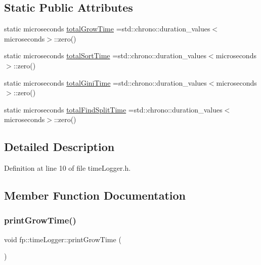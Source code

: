 \subsection*{Static Public Attributes}
\begin{DoxyCompactItemize}
\item 
static microseconds \hyperlink{classfp_1_1timeLogger_ae79b7283b8f150e851fc325c29618ba1}{total\+Grow\+Time} =std\+::chrono\+::duration\+\_\+values$<$microseconds$>$\+::zero()
\item 
static microseconds \hyperlink{classfp_1_1timeLogger_a3ac30f8dba0551c3cd3f57dc4806e56e}{total\+Sort\+Time} =std\+::chrono\+::duration\+\_\+values$<$microseconds$>$\+::zero()
\item 
static microseconds \hyperlink{classfp_1_1timeLogger_a1f1c446894052c4df2100b501069a927}{total\+Gini\+Time} =std\+::chrono\+::duration\+\_\+values$<$microseconds$>$\+::zero()
\item 
static microseconds \hyperlink{classfp_1_1timeLogger_a11998b4bff9e1f548f4468e25f79a6f2}{total\+Find\+Split\+Time} =std\+::chrono\+::duration\+\_\+values$<$microseconds$>$\+::zero()
\end{DoxyCompactItemize}


\subsection{Detailed Description}


Definition at line 10 of file time\+Logger.\+h.



\subsection{Member Function Documentation}
\mbox{\label{classfp_1_1timeLogger_a0fc73becc2212e5518d300c514855798}} 
\subsubsection{\texorpdfstring{print\+Grow\+Time()}{printGrowTime()}}
{\footnotesize\ttfamily void fp\+::time\+Logger\+::print\+Grow\+Time (\begin{DoxyParamCaption}{ }\end{DoxyParamCaption})\hspace{0.3cm}{\ttfamily [inline]}}



